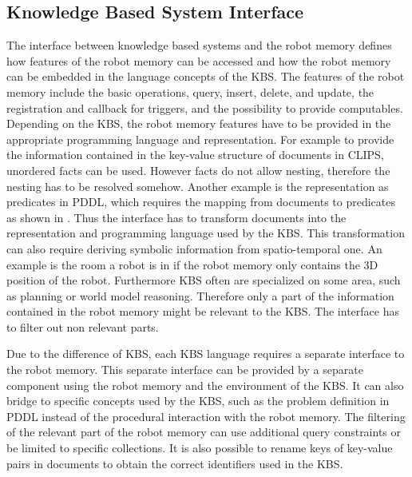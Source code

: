\subsection{Knowledge Based System Interface}
\label{sec:kbs-interface}
The interface between knowledge based systems and the robot memory
defines how features of the robot memory can be accessed and how the
robot memory can be embedded in the language concepts of the KBS. The
features of the robot memory include the basic operations, query,
insert, delete, and update, the registration and callback for
triggers, and the possibility to provide computables.  Depending on
the KBS, the robot memory features have to be provided in the
appropriate programming language and representation. For example to
provide the information contained in the key-value structure of
documents in CLIPS, unordered facts can be used. However facts do not
allow nesting, therefore the nesting has to be resolved
somehow. Another example is the representation as predicates in PDDL,
which requires the mapping from documents to predicates as shown in
. Thus the interface has to transform documents
into the representation and programming language used by the KBS. This
transformation can also require deriving symbolic information from
spatio-temporal one. An example is the room a robot is in if the robot
memory only contains the 3D position of the robot. Furthermore KBS
often are specialized on some area, such as planning or world model
reasoning. Therefore only a part of the information contained in the
robot memory might be relevant to the KBS. The interface has to filter
out non relevant parts.

Due to the difference of KBS, each KBS language requires a separate
interface to the robot memory. This separate interface can be provided
by a separate component using the robot memory and the environment of
the KBS. It can also bridge to specific concepts used by the KBS, such
as the problem definition in PDDL instead of the procedural
interaction with the robot memory. The filtering of the relevant part
of the robot memory can use additional query constraints or be limited
to specific collections. It is also possible to rename keys of
key-value pairs in documents to obtain the correct identifiers used in
the KBS.

